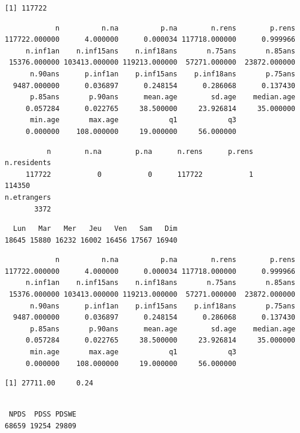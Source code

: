 \documentclass[]{article}
\begin{document}
\begin{verbatim}
[1] 117722
\end{verbatim}

\begin{verbatim}
            n          n.na          p.na        n.rens        p.rens 
117722.000000      4.000000      0.000034 117718.000000      0.999966 
     n.inf1an    n.inf15ans    n.inf18ans       n.75ans       n.85ans 
 15376.000000 103413.000000 119213.000000  57271.000000  23872.000000 
      n.90ans      p.inf1an    p.inf15ans    p.inf18ans       p.75ans 
  9487.000000      0.036897      0.248154      0.286068      0.137430 
      p.85ans       p.90ans      mean.age        sd.age    median.age 
     0.057284      0.022765     38.500000     23.926814     35.000000 
      min.age       max.age            q1            q3 
     0.000000    108.000000     19.000000     56.000000 
\end{verbatim}

\begin{verbatim}
          n        n.na        p.na      n.rens      p.rens n.residents 
     117722           0           0      117722           1      114350 
n.etrangers 
       3372 
\end{verbatim}

\begin{verbatim}
  Lun   Mar   Mer   Jeu   Ven   Sam   Dim 
18645 15880 16232 16002 16456 17567 16940 
\end{verbatim}

\begin{verbatim}
            n          n.na          p.na        n.rens        p.rens 
117722.000000      4.000000      0.000034 117718.000000      0.999966 
     n.inf1an    n.inf15ans    n.inf18ans       n.75ans       n.85ans 
 15376.000000 103413.000000 119213.000000  57271.000000  23872.000000 
      n.90ans      p.inf1an    p.inf15ans    p.inf18ans       p.75ans 
  9487.000000      0.036897      0.248154      0.286068      0.137430 
      p.85ans       p.90ans      mean.age        sd.age    median.age 
     0.057284      0.022765     38.500000     23.926814     35.000000 
      min.age       max.age            q1            q3 
     0.000000    108.000000     19.000000     56.000000 
\end{verbatim}

\begin{verbatim}
[1] 27711.00     0.24
\end{verbatim}

\begin{verbatim}

 NPDS  PDSS PDSWE 
68659 19254 29809 
\end{verbatim}
\end{document}
